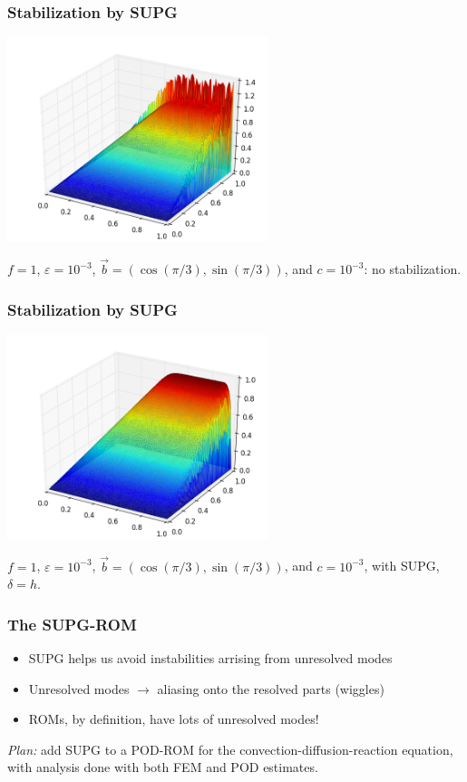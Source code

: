 \documentclass[8pt]{beamer}
\begin{document}
    \begin{frame}
        \frametitle{Stabilization by SUPG}
        \begin{center}
            \includegraphics[width=3in]{Pictures/CDR/cdr_unstabilized.png}

            \(f = 1\), \(\varepsilon = 10^{-3}\), \(\vec{b} = (\cos(\pi/3),
            \sin(\pi/3))\), and \(c = 10^{-3}\): no stabilization.
        \end{center}
    \end{frame}

    \begin{frame}
        \frametitle{Stabilization by SUPG}
        \begin{center}
            \includegraphics[width=3in]{Pictures/CDR/cdr_stabilized.png}

            \(f = 1\), \(\varepsilon = 10^{-3}\), \(\vec{b} = (\cos(\pi/3),
            \sin(\pi/3))\), and \(c = 10^{-3}\), with SUPG, \(\delta = h\).
        \end{center}
    \end{frame}

    \begin{frame}
        \frametitle{The SUPG-ROM}
        \begin{itemize}
            \item SUPG helps us avoid instabilities arrising from unresolved
                  modes
                  \pause
            \item Unresolved modes \(\rightarrow\) aliasing onto the resolved
                  parts (wiggles)
                  \pause
            \item ROMs, by definition, have lots of unresolved modes!
        \end{itemize}
        \pause
        \emph{Plan:} add SUPG to a POD-ROM for the convection-diffusion-reaction
        equation, with analysis done with both FEM and POD estimates.
    \end{frame}
\end{document}
